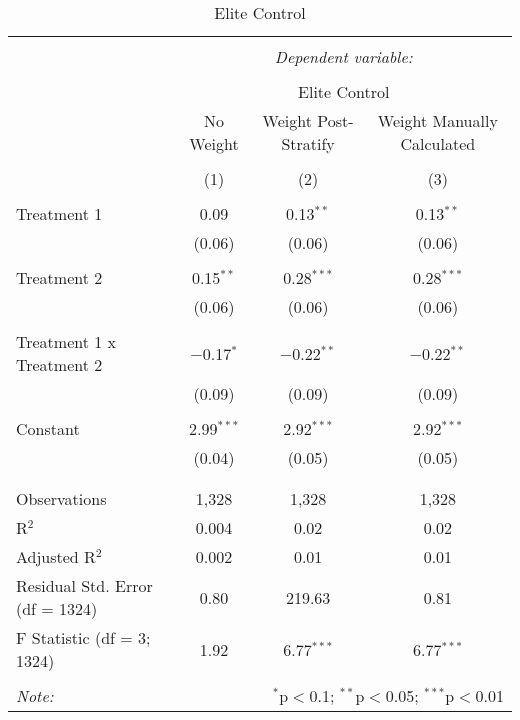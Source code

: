 
\begin{table}[!htbp] \centering 
  \caption{Elite Control} 
  \label{} 
\begin{tabular}{@{\extracolsep{5pt}}lccc} 
\\[-1.8ex]\hline 
\hline \\[-1.8ex] 
 & \multicolumn{3}{c}{\textit{Dependent variable:}} \\ 
\cline{2-4} 
\\[-1.8ex] & \multicolumn{3}{c}{Elite Control} \\ 
 & No Weight & Weight Post-Stratify & Weight Manually Calculated \\ 
\\[-1.8ex] & (1) & (2) & (3)\\ 
\hline \\[-1.8ex] 
 Treatment 1 & 0.09 & 0.13$^{**}$ & 0.13$^{**}$ \\ 
  & (0.06) & (0.06) & (0.06) \\ 
  & & & \\ 
 Treatment 2 & 0.15$^{**}$ & 0.28$^{***}$ & 0.28$^{***}$ \\ 
  & (0.06) & (0.06) & (0.06) \\ 
  & & & \\ 
 Treatment 1 x Treatment 2 & $-$0.17$^{*}$ & $-$0.22$^{**}$ & $-$0.22$^{**}$ \\ 
  & (0.09) & (0.09) & (0.09) \\ 
  & & & \\ 
 Constant & 2.99$^{***}$ & 2.92$^{***}$ & 2.92$^{***}$ \\ 
  & (0.04) & (0.05) & (0.05) \\ 
  & & & \\ 
\hline \\[-1.8ex] 
Observations & 1,328 & 1,328 & 1,328 \\ 
R$^{2}$ & 0.004 & 0.02 & 0.02 \\ 
Adjusted R$^{2}$ & 0.002 & 0.01 & 0.01 \\ 
Residual Std. Error (df = 1324) & 0.80 & 219.63 & 0.81 \\ 
F Statistic (df = 3; 1324) & 1.92 & 6.77$^{***}$ & 6.77$^{***}$ \\ 
\hline 
\hline \\[-1.8ex] 
\textit{Note:}  & \multicolumn{3}{r}{$^{*}$p$<$0.1; $^{**}$p$<$0.05; $^{***}$p$<$0.01} \\ 
\end{tabular} 
\end{table} 
